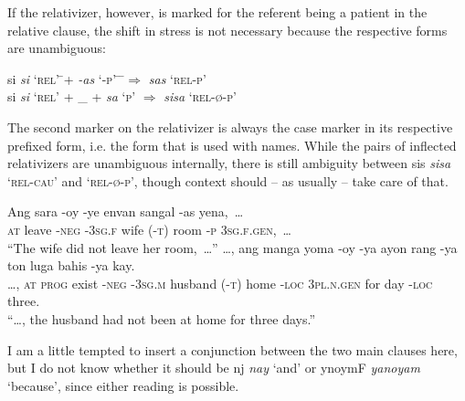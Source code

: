 \documentclass[12pt,paper=letter]{scrartcl}
\newcommand{\fw}[1]{\textit{#1}} %
\newcommand{\q}[1]{\enquote{#1}} %
\newcommand{\qq}[1]{\enquote*{#1}} %
\newcommand{\divider}{
    \vspace{\baselineskip}
}
\newcommand{\mor}[1]{\textsc{\lowercase{#1}}}
\newcommand{\ayr}[1]{{\Tagati #1}}
\begin{document}
If the relativizer, however, is marked for the referent being a patient in the 
relative clause, the shift in stress is not necessary because the respective
forms are unambiguous:

\begin{exe}
    \exi{}
    \begin{xlist}
	 \begin{tabbing}
	    \ayr{si} \fw{si} \qq{\mor{REL}}
		\= \enskip + \enskip \ayr{/AsF} \fw{-as} \qq{\mor{-P}} \hspace{1.5em}
		\= \hspace{7em}
		\= \enskip $\Rightarrow$ \enskip \ayr{ssF} \fw{sas} \qq{\mor{REL-P}} \\
	    \ayr{si} \fw{si} \qq{\mor{REL}}
		\> \enskip + \enskip \_\fakesubscript{\mor{case}}
		\> \enskip + \enskip \ayr{s} \fw{sa} \qq{\mor{P}}
		\> \enskip $\Rightarrow$ \enskip \ayr{sis} \fw{sisa} \qq{\mor{REL-Ø-P}}
	\end{tabbing}
    \end{xlist}
\end{exe}

The second marker on the relativizer is always the case marker in its respective
prefixed form, i.e. the form that is used with names. While the pairs of 
inflected relativizers are unambiguous internally, there is still ambiguity 
between \ayr{sis} \fw{sisa} \qq{\mor{REL-CAU}} and \qq{\mor{REL-Ø-P}}, though
context should -- as usually -- take care of that.

\divider

\begin{exe}  %
    \ex
    \begin{xlist}
	\ex \gll Ang sara -oy -ye envan {} sangal -as yena,~… \\
	\mor{AT} leave \mor{-NEG} \mor{-3SG.F} wife \mor{(-T)} room \mor{-P} 
	    \mor{3SG.F.GEN},~… \\
	\glt \q{The wife did not leave her room,~…}
	\goodbreak
	\ex \gll …, ang manga yoma -oy -ya ayon {} rang -ya ton luga bahis -ya 
	    kay. \\
	…, \mor{AT} \mor{PROG} exist \mor{-NEG} \mor{-3SG.M} husband \mor{(-T)} 
	    home \mor{-LOC} \mor{3PL.N.GEN} for day \mor{-LOC} three. \\
	\glt \q{…, the husband had not been at home for three days.}
    \end{xlist}
\end{exe}

I am a little tempted to insert a conjunction between the two main clauses here,
but I do not know whether it should be \ayr{nj} \fw{nay} \qq{and} or \ayr{ynoymF}
\fw{yanoyam} \qq{because}, since either reading is possible.
\end{document}
